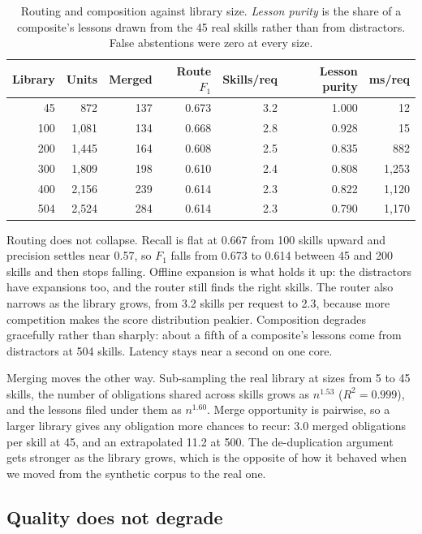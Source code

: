 \documentclass[11pt]{article}
\begin{document}
\begin{table}[t]\centering\small
\begin{tabular}{rrrrrrr}
\toprule
Library & Units & Merged & Route $F_1$ & Skills/req & Lesson purity & ms/req \\
\midrule
45 & 872 & 137 & 0.673 & 3.2 & 1.000 & 12 \\
100 & 1{,}081 & 134 & 0.668 & 2.8 & 0.928 & 15 \\
200 & 1{,}445 & 164 & 0.608 & 2.5 & 0.835 & 882 \\
300 & 1{,}809 & 198 & 0.610 & 2.4 & 0.808 & 1{,}253 \\
400 & 2{,}156 & 239 & 0.614 & 2.3 & 0.822 & 1{,}120 \\
504 & 2{,}524 & 284 & 0.614 & 2.3 & 0.790 & 1{,}170 \\
\bottomrule
\end{tabular}
\caption{Routing and composition against library size. \emph{Lesson purity} is the share of a
composite's lessons drawn from the 45 real skills rather than from distractors. False abstentions
were zero at every size.}
\label{tab:scaleroute}
\end{table}

Routing does not collapse. Recall is flat at 0.667 from 100 skills upward and precision settles
near 0.57, so $F_1$ falls from 0.673 to 0.614 between 45 and 200 skills and then stops falling.
Offline expansion is what holds it up: the distractors have expansions too, and the router still
finds the right skills. The router also narrows as the library grows, from 3.2 skills per request
to 2.3, because more competition makes the score distribution peakier. Composition degrades
gracefully rather than sharply: about a fifth of a composite's lessons come from distractors at 504
skills. Latency stays near a second on one core.

Merging moves the other way. Sub-sampling the real library at sizes from 5 to 45 skills, the number
of obligations shared across skills grows as $n^{1.53}$ ($R^2 = 0.999$), and the lessons filed under
them as $n^{1.60}$. Merge opportunity is pairwise, so a larger library gives any obligation more
chances to recur: 3.0 merged obligations per skill at 45, and an extrapolated 11.2 at 500. The
de-duplication argument gets stronger as the library grows, which is the opposite of how it behaved
when we moved from the synthetic corpus to the real one.

\subsection{Quality does not degrade}
\end{document}

